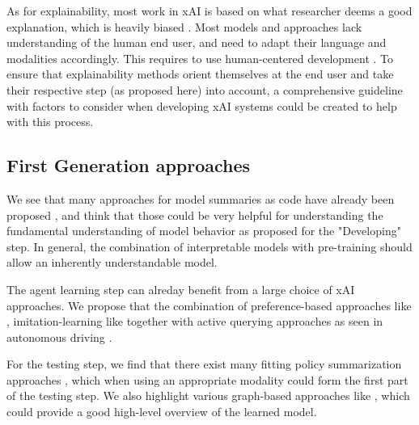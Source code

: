\documentclass[twoside,11pt]{article}
\begin{document}

As for explainability, most work in xAI is based on what researcher deems a good explanation, which is heavily biased \cite{Miller:2019:xAISocialSciencesInsights}. Most models and approaches lack understanding of the human end user, and need to adapt their language and modalities accordingly. This requires to use human-centered development \cite{PuiuttaVeith:2020:xAIRLSurvey}. To ensure that explainability methods orient themselves at the end user and take their respective step (as proposed here) into account, a comprehensive guideline with factors to consider when developing xAI systems could be created to help with this process.

\subsection{First Generation approaches}


We see that many approaches for model summaries as code have already been proposed \citep{VermaEtAl:2018:ProgrammaticallyInterpretableRL}, and think that those could be very helpful for understanding the fundamental understanding of model behavior as proposed for the "Developing" step. In general, the combination of interpretable models with pre-training should allow an inherently understandable model.


The agent learning step can alreday benefit from a large choice of xAI approaches. We propose that the combination of preference-based approaches like \citep{LeeSmithAbbeel:2021:FeedbackPreferenceHITLLearningPEBBLE}, imitation-learning like \cite{HusseinEtAl:2017:ImitationLearning} together with active querying approaches as seen in autonomous driving \cite{WuEtAl:2021:HITLDRLAutonomousDriving}.


For the testing step, we find that there exist many fitting policy summarization approaches \cite{LiuEtAl:2018:LinearModelUTrees}, which when using an appropriate modality could form the first part of the testing step. We also highlight various graph-based approaches like \cite{SongEtAl:2019:ExplainableGraphBasedRecommendations}, which could provide a good high-level overview of the learned model.

\end{document}
